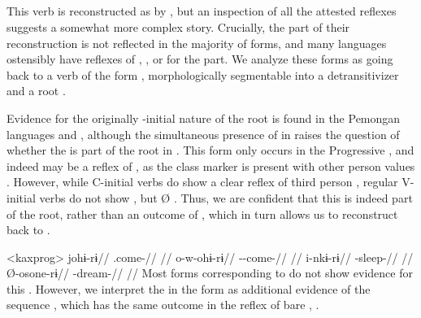 \subsection{ }
\label{sec:come}



This verb is reconstructed as  by \textcite[30]{gildea2007greenberg}, but an inspection of all the attested reflexes  suggests a somewhat more complex story.
Crucially, the  part of their reconstruction is not reflected in the majority of forms, and many languages ostensibly have reflexes of , , or  for the  part.
We analyze these forms as going back to a \PC verb of the form , morphologically segmentable into a detransitivizer and a root .

Evidence for the originally -initial nature of the root is found in the Pemongan languages and \kaxui, although the simultaneous presence of  in \kaxui raises the question of whether the  is part of the root in .
This form only occurs in the Progressive , and indeed  may be a reflex of  , as the  class marker  is present with other person values .
However, while C-initial verbs do show a clear reflex of third person  , regular V-initial  verbs do not show , but Ø .
Thus, we are confident that this  is indeed part of the root, rather than an outcome of , which in turn allows us to reconstruct  back to \PC.

\pex<kaxprog>\kaxui {}
\begingl
\gla johɨ-rɨ//
\glb {}.come-//
\glft {}//
\endgl
{}
\begingl
\gla o-w-ohɨ-rɨ//
\glb {}--come-//
\glft {}//
\endgl
{}
\begingl
\gla i-nkɨ-rɨ//
\glb {}-sleep-//
\glft {}//
\endgl
{}
\begingl
\gla Ø-osone-rɨ//
\glb {}-dream-//
\glft {}//
\endgl
\xe
%
Most forms corresponding to   do not show evidence for this .
However, we interpret the  in the \akawaio form  as additional evidence of the sequence , which has the same outcome  in the \macushi reflex of bare , .

